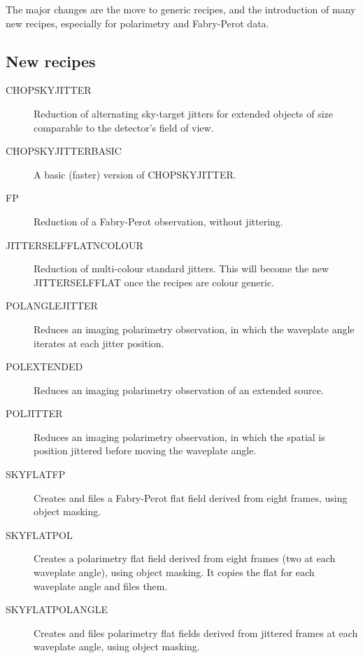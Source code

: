 \documentclass[twoside,11pt]{article}
\newcommand{\htmlref}[2]{#1}
\renewcommand{\_}{\texttt{\symbol{95}}}
\begin{document}
The major changes are the move to generic recipes, and the introduction
of many new recipes, especially for polarimetry and Fabry-Perot data.

\subsection{New recipes}
\begin{description}
   \item [\htmlref{CHOP\_SKY\_JITTER}{CHOP\_SKY\_JITTER}]
      Reduction of alternating sky-target jitters for extended objects
      of size comparable to the detector's field of view.
   \item [\htmlref{CHOP\_SKY\_JITTER\_BASIC}{CHOP\_SKY\_JITTER\_BASIC}]
      A basic (faster) version of CHOP\_SKY\_JITTER.
   \item [\htmlref{FP}{FP}]
      Reduction of a Fabry-Perot observation, without jittering.
   \item [\htmlref{JITTER\_SELF\_FLAT\_NCOLOUR}{JITTER\_SELF\_FLAT\_NCOLOUR}]
      Reduction of multi-colour standard jitters.  This will become
      the new JITTER\_SELF\_FLAT once the recipes are colour generic.
   \item [\htmlref{POL\_ANGLE\_JITTER}{POL\_ANGLE\_JITTER}]
      Reduces an imaging polarimetry observation, in which the
      waveplate angle iterates at each jitter position.
   \item [\htmlref{POL\_EXTENDED}{POL\_EXTENDED}]
      Reduces an imaging polarimetry observation of an extended
      source.
   \item [\htmlref{POL\_JITTER}{POL\_JITTER}]
      Reduces an imaging polarimetry observation, in which the
      spatial is position jittered before moving the waveplate
      angle.
   \item [\htmlref{SKY\_FLAT\_FP}{SKY\_FLAT\_FP}]
      Creates and files a Fabry-Perot flat field derived from eight
      frames, using object masking.
   \item [\htmlref{SKY\_FLAT\_POL}{SKY\_FLAT\_POL}]
      Creates a polarimetry flat field derived from eight frames
      (two at each waveplate angle), using object masking.  It copies
      the flat for each waveplate angle and files them.
   \item [\htmlref{SKY\_FLAT\_POL\_ANGLE}{SKY\_FLAT\_POL\_ANGLE}]
      Creates and files polarimetry flat fields derived from jittered
      frames at each waveplate angle, using object masking.
\end{description}
\end{document}
